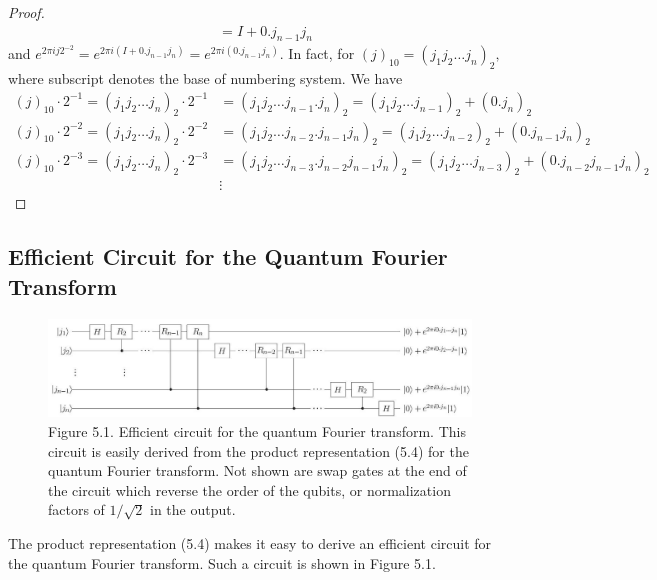 \begin{proof}
\begin{align}
    &=I + 0.j_{n-1}j_n
\end{align}
and $e^{2 \pi i  j 2^{-2}}=e^{2 \pi i (I + 0.j_{n-1}j_n)}=e^{2 \pi i (0.j_{n-1}j_n)}$. In fact, for $(j)_{10}=(j_{1} j_{2} \ldots j_{n})_{2},$ where subscript denotes the base of numbering system. We have 
\begin{align}
    (j)_{10} \cdot 2^{-1} = (j_{1} j_{2} \ldots j_{n})_{2} \cdot 2^{-1} 
    &= (j_{1} j_{2} \ldots j_{n-1}. j_{n})_{2} =  (j_{1} j_{2} \ldots j_{n-1})_{2}+  (0. j_{n})_{2} \\
    (j)_{10} \cdot 2^{-2} = (j_{1} j_{2} \ldots j_{n})_{2} \cdot 2^{-2} 
    &= (j_{1} j_{2} \ldots j_{n-2} . j_{n-1} j_{n})_{2} =  (j_{1} j_{2} \ldots j_{n-2})_{2}+  (0. j_{n-1} j_{n})_{2} \\
    (j)_{10} \cdot 2^{-3} = (j_{1} j_{2} \ldots j_{n})_{2} \cdot 2^{-3} 
    &= (j_{1} j_{2} \ldots j_{n-3} . j_{n-2} j_{n-1} j_{n})_{2} =  (j_{1} j_{2} \ldots j_{n-3})_{2}+  (0. j_{n-2} j_{n-1} j_{n})_{2} \\
    & \vdots
\end{align}
\end{proof}

\subsection{Efficient Circuit for the Quantum Fourier Transform}

\begin{figure}     
\centering
\includegraphics[width=1\linewidth]{Images/2024_05_17_6977ce60de6fd27aef98g-253}
\caption{Figure 5.1. Efficient circuit for the quantum Fourier transform. This circuit is easily derived from the product representation (5.4) for the quantum Fourier transform. Not shown are swap gates at the end of the circuit which reverse the order of the qubits, or normalization factors of $1 / \sqrt{2}$ in the output.}
\end{figure}

The product representation (5.4) makes it easy to derive an efficient circuit for the quantum Fourier transform. Such a circuit is shown in Figure 5.1. 

